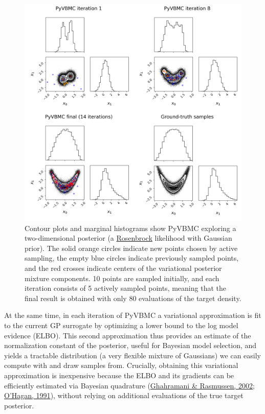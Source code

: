 \documentclass[
]{article}
\begin{document}
\begin{figure}
\centering
\includegraphics{combined_figures_with_gt.png}
\caption{Contour plots and marginal histograms show PyVBMC exploring a
two-dimensional posterior (a
\href{https://en.wikipedia.org/wiki/Rosenbrock_function}{Rosenbrock}
likelihood with Gaussian prior). The solid orange circles indicate new
points chosen by active sampling, the empty blue circles indicate
previously sampled points, and the red crosses indicate centers of the
variational posterior mixture components. 10 points are sampled
initially, and each iteration consists of 5 actively sampled points,
meaning that the final result is obtained with only 80 evaluations of
the target density.\label{fig:example}}
\end{figure}

At the same time, in each iteration of PyVBMC a variational
approximation is fit to the current GP surrogate by optimizing a lower
bound to the log model evidence (ELBO). This second approximation thus
provides an estimate of the normalization constant of the posterior,
useful for Bayesian model selection, and yields a tractable distribution
(a very flexible mixture of Gaussians) we can easily compute with and
draw samples from. Crucially, obtaining this variational approximation
is inexpensive because the ELBO and its gradients can be efficiently
estimated via Bayesian quadrature
(\protect\hyperlink{ref-ghahramani_bayesian_2002}{Ghahramani \&
Rasmussen, 2002}; \protect\hyperlink{ref-ohagan_bayesian_1991}{O'Hagan,
1991}), without relying on additional evaluations of the true target
posterior.
\end{document}
